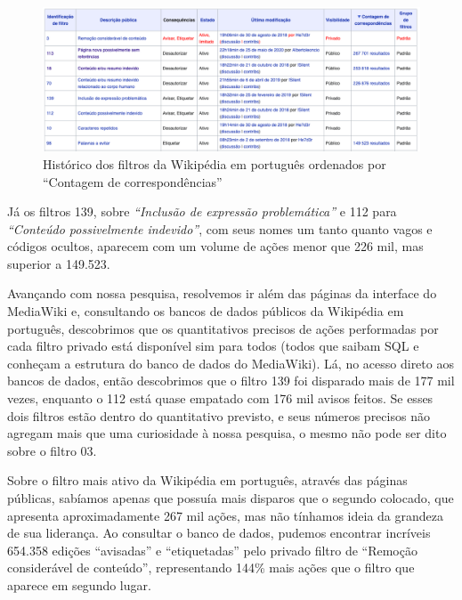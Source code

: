 \begin{figure}[H]
    \centering
    \includegraphics[width=1\textwidth]{Images/historico_filtros_wikipedia.png}
    \caption{Histórico dos filtros da Wikipédia em português ordenados por ``Contagem de correspondências'' }
    \label{fig:historico_filtros_wikipedia}
\end{figure}

Já os filtros 139, sobre \textit{``Inclusão de expressão problemática''} e 112 para \textit{``Conteúdo possivelmente indevido''}, com seus nomes um tanto quanto vagos e códigos ocultos, aparecem com um volume de ações menor que 226 mil, mas superior a 149.523. 

Avançando com nossa pesquisa, resolvemos ir além das páginas da interface do MediaWiki e, consultando os bancos de dados públicos da Wikipédia em português, descobrimos que os quantitativos precisos de ações performadas por cada filtro privado está disponível sim para todos (todos que saibam SQL e conheçam a estrutura do banco de dados do MediaWiki). Lá, no acesso direto aos bancos de dados, então descobrimos que o filtro 139 foi disparado mais de 177 mil vezes, enquanto o 112 está quase empatado com 176 mil avisos feitos. Se esses dois filtros estão dentro do quantitativo previsto, e seus números precisos não agregam mais que uma curiosidade à nossa pesquisa, o mesmo não pode ser dito sobre o filtro 03. 

Sobre o filtro mais ativo da Wikipédia em português, através das páginas públicas, sabíamos apenas que possuía mais disparos que o segundo colocado, que apresenta aproximadamente 267 mil ações, mas não tínhamos ideia da grandeza de sua liderança. Ao consultar o banco de dados, pudemos encontrar incríveis 654.358 edições ``avisadas'' e ``etiquetadas'' pelo privado filtro de ``Remoção considerável de conteúdo'', representando 144\% mais ações que o filtro que aparece em segundo lugar.


